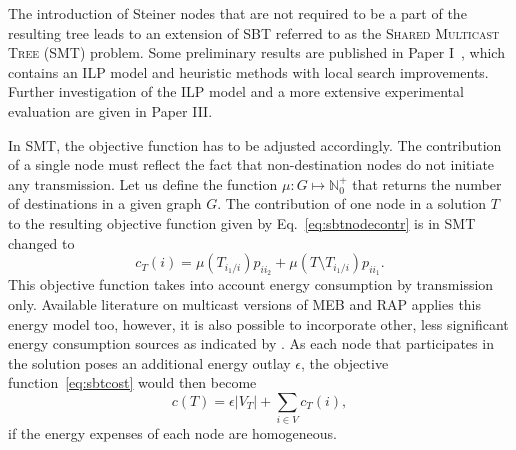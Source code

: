 The introduction of Steiner nodes that are not required to be a part of the resulting tree leads to an extension of SBT referred to as the \textsc{Shared Multicast Tree} (SMT) problem.
Some preliminary results are published in Paper I~\cite{ivanova16}, which contains an ILP model and heuristic methods with local search improvements.
Further investigation of the ILP model and a more extensive experimental evaluation are given in Paper III.

In SMT, the objective function has to be adjusted accordingly. 
The contribution of a single node must reflect the fact that non-destination nodes do not initiate any transmission.
Let us define the function $\mu: G\mapsto \mathbb{N}^+_0$ that returns the number of destinations in a given graph $G$.
The contribution of one node in a solution $T$ to the resulting objective function given by Eq.~\eqref{eq:sbtnodecontr} is in SMT changed to 
\begin{equation}\label{eq:smtnodecontr}
c_T(i)=\mu(T_{i_1/i})p_{ii_2} + \mu(T\setminus T_{i_1/i})p_{ii_1}.
\end{equation}
This objective function takes into account energy consumption by transmission only.
Available literature on multicast versions of MEB and RAP applies this energy model too, however, it is also possible to incorporate other,
less significant energy consumption sources as indicated by \cite{halgamuge09}.
As each node that participates in the solution poses an additional energy outlay $\epsilon$, the objective function~\ref{eq:sbtcost} would then become
\begin{equation}
c(T)=\epsilon|V_T|+\sum\limits_{i\in V}c_T(i),
\label{eq:smtcostB}
\end{equation}
if the energy expenses of each node are homogeneous. 

